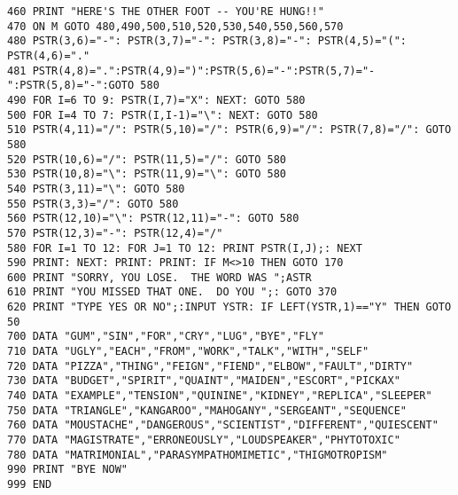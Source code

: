 \begin{lstlisting}
460 PRINT "HERE'S THE OTHER FOOT -- YOU'RE HUNG!!"
470 ON M GOTO 480,490,500,510,520,530,540,550,560,570
480 PSTR(3,6)="-": PSTR(3,7)="-": PSTR(3,8)="-": PSTR(4,5)="(": PSTR(4,6)="."
481 PSTR(4,8)=".":PSTR(4,9)=")":PSTR(5,6)="-":PSTR(5,7)="-":PSTR(5,8)="-":GOTO 580
490 FOR I=6 TO 9: PSTR(I,7)="X": NEXT: GOTO 580
500 FOR I=4 TO 7: PSTR(I,I-1)="\": NEXT: GOTO 580
510 PSTR(4,11)="/": PSTR(5,10)="/": PSTR(6,9)="/": PSTR(7,8)="/": GOTO 580
520 PSTR(10,6)="/": PSTR(11,5)="/": GOTO 580
530 PSTR(10,8)="\": PSTR(11,9)="\": GOTO 580
540 PSTR(3,11)="\": GOTO 580
550 PSTR(3,3)="/": GOTO 580
560 PSTR(12,10)="\": PSTR(12,11)="-": GOTO 580
570 PSTR(12,3)="-": PSTR(12,4)="/"
580 FOR I=1 TO 12: FOR J=1 TO 12: PRINT PSTR(I,J);: NEXT
590 PRINT: NEXT: PRINT: PRINT: IF M<>10 THEN GOTO 170
600 PRINT "SORRY, YOU LOSE.  THE WORD WAS ";ASTR
610 PRINT "YOU MISSED THAT ONE.  DO YOU ";: GOTO 370
620 PRINT "TYPE YES OR NO";:INPUT YSTR: IF LEFT(YSTR,1)=="Y" THEN GOTO 50
700 DATA "GUM","SIN","FOR","CRY","LUG","BYE","FLY"
710 DATA "UGLY","EACH","FROM","WORK","TALK","WITH","SELF"
720 DATA "PIZZA","THING","FEIGN","FIEND","ELBOW","FAULT","DIRTY"
730 DATA "BUDGET","SPIRIT","QUAINT","MAIDEN","ESCORT","PICKAX"
740 DATA "EXAMPLE","TENSION","QUININE","KIDNEY","REPLICA","SLEEPER"
750 DATA "TRIANGLE","KANGAROO","MAHOGANY","SERGEANT","SEQUENCE"
760 DATA "MOUSTACHE","DANGEROUS","SCIENTIST","DIFFERENT","QUIESCENT"
770 DATA "MAGISTRATE","ERRONEOUSLY","LOUDSPEAKER","PHYTOTOXIC"
780 DATA "MATRIMONIAL","PARASYMPATHOMIMETIC","THIGMOTROPISM"
990 PRINT "BYE NOW"
999 END
\end{lstlisting}

